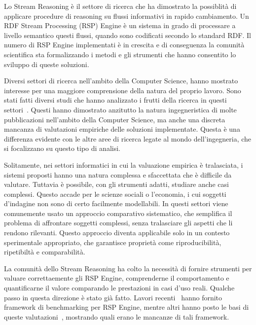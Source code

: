 Lo Stream Reasoning \`e  il settore di ricerca che ha dimostrato la possiblit\`a di applicare procedure di reasoning su flussi informativi in rapido cambiamento. Un RDF Stream Processing (RSP) Engine \`e  un sistema in grado di processare a livello semantico questi flussi, quando sono codificati secondo lo standard RDF. Il numero di RSP Engine implementati \`e  in crescita e di conseguenza la comunit\`a scientifica sta formalizzando i metodi e gli strumenti che hanno consentito lo sviluppo di queste soluzioni.

Diversi settori di ricerca nell'ambito della Computer Science, hanno mostrato interesse per una maggiore comprensione della natura del proprio lavoro. Sono stati fatti diversi studi che hanno analizzato i frutti della ricerca in questi settori~\cite{Tichy:1995:EEC:209090.209093, Wainer:2009:EEC:1518331.1518552}. Questi hanno dimostrato anzitutto la natura ingegneristica di molte pubblicazioni nell'ambito della Computer Science, ma anche una discreta mancanza di valutazioni empiriche delle soluzioni implementate. Questa \`e  una differenza evidente con le altre aree di ricerca legate al mondo dell'ingegneria, che si focalizzano su questo tipo di analisi.

Solitamente, nei settori informatici in cui la valuazione empirica \`e tralasciata, i sistemi proposti hanno una natura complessa e sfaccettata che \`e difficile da valutare. Tuttavia \`e  possibile, con gli strumenti adatti, studiare anche casi complessi. Questo accade per le scienze sociali o l'economia, i cui soggetti d'indagine non sono di certo facilmente modellabili. In questi settori viene comunemente usato un approccio comparativo sistematico, che semplifica il problema di affrontare soggetti complessi, senza tralasciare gli aspetti che li rendono rilevanti. Questo approccio diventa applicabile solo in un contesto sperimentale appropriato, che garantisce propriet\`a come riproducibilit\`a, ripetibilt\`a e comparabilit\`a.

La comunit\`a dello Stream Reasoning ha colto la necessit\`a di fornire strumenti per valuare correttaemente gli RSP Engine,  comprenderne il comportamento e quantificarne il valore comparando le prestazioni in casi d'uso reali. Qualche passo in questa direzione \`e  stato gi\`a fatto. Lavori recenti~\cite{Zhang2012, LePhuoc2012c, DBLP:conf/semweb/DellAglioCBCV13} hanno fornito framework di benchmarking per RSP Engine, mentre altri hanno posto le basi di queste valutazioni~\cite{DBLP:conf/esws/ScharrenbachUMVB13}, mostrando quali erano le mancanze di tali framework.

